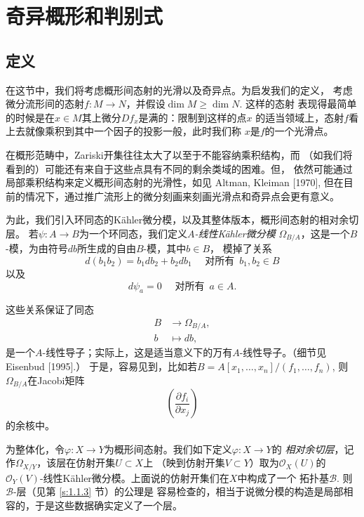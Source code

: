 \section{奇异概形和判别式}\label{s:5.3}

\subsection{定义}\label{s:5.3.1}

在这节中，我们将考虑概形间态射的光滑以及奇异点。为启发我们的定义，
考虑微分流形间的态射$f:M\to N$，并假设$\dim M\geq \dim N$. 这样的态射
表现得最简单的时候是在$x\in M$其上微分$Df_x$是满的：限制到这样的点$x$
的适当领域上，态射$f$看上去就像乘积到其中一个因子的投影一般，此时我们称
$x$是$f$的一个光滑点。

在概形范畴中，Zariski开集往往太大了以至于不能容纳乘积结构，而
（如我们将看到的）可能还有来自于这些点具有不同的剩余类域的困难。但，
依然可能通过局部乘积结构来定义概形间态射的光滑性，如见 Altman, Kleiman [1970],
但在目前的情况下，通过推广流形上的微分刻画来刻画光滑点和奇异点会更有意义。

为此，我们引入环同态的K\"ahler微分模，以及其整体版本，概形间态射的相对余切层。
若$\psi:A\to B$为一个环同态，我们定义\textit{$A$-线性K\"ahler微分模}
$\Omega_{B/A}$，这是一个$B$-模，为由符号$db$所生成的自由$B$-模，其中$b\in B$，
模掉了关系
\[
    d(b_1 b_2)=b_1 d b_2+b_2 d b_1 \quad \text { 对所有 }\,b_1, b_2 \in B
\]
以及 
\[
    d \psi_a=0 \quad \text { 对所有 }\,a \in A.
\]

这些关系保证了同态
\[
    \begin{aligned}
        B & \longrightarrow \Omega_{B / A}, \\
        b & \longmapsto d b,
    \end{aligned}
\]
是一个$A$-线性导子；实际上，这是适当意义下的万有$A$-线性导子。（细节见
Eisenbud [1995].） 于是，容易见到，比如若$B=A[x_1,\dots,x_n]/(f_1,\dots,f_n)$,
则$\Omega_{B/A}$在Jacobi矩阵
\[
    \left(\frac{\partial f_i}{\partial x_j}\right)
\]
的余核中。

为整体化，令$\varphi:X\to Y$为概形间态射。我们如下定义$\varphi:X\to Y$的
\textit{相对余切层}，记作$\Omega_{X/Y}$，该层在仿射开集$U\subset X$上
（映到仿射开集$V\subset Y$）取为$\mathscr O_X(U)$的
$\mathscr O_Y(V)$-线性K\"ahler微分模。上面说的仿射开集们在$X$中构成了一个
拓扑基$\mathscr B$. 则$\mathscr B$-层（见第 \ref{s:1.1.3} 节）的公理是
容易检查的，相当于说微分模的构造是局部相容的，于是这些数据确实定义了一个层。


